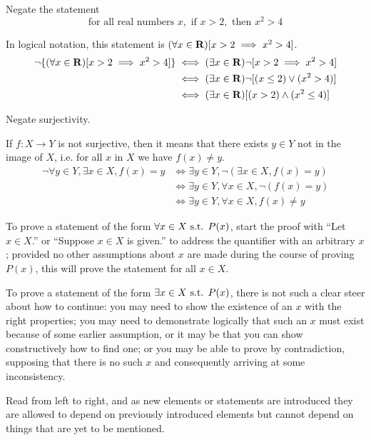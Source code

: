 \begin{exercise}
Negate the statement
\[ \text{for all real numbers } x, \text{ if } x>2, \text{ then } x^2>4 \]
\end{exercise}
\begin{solution}
In logical notation, this statement is $(\forall x \in \mathbf R)[x>2 \implies x^2>4]$.
\begin{align*}
\lnot\{(\forall x \in \mathbf R)[x>2 \implies x^2>4]\} 
&\iff (\exists x \in \mathbf R) \lnot[x>2 \implies x^2>4] \\
&\iff (\exists x \in \mathbf R) \lnot [(x\le2) \lor (x^2>4)] \\
&\iff (\exists x \in \mathbf R) [(x>2) \land (x^2\le4)]
\end{align*}
\end{solution}

\begin{exercise}
Negate surjectivity.
\end{exercise}
\begin{solution}
If $f:X\to Y$ is not surjective, then it means that there exists $y \in Y$ not in the image of $X$, i.e. for all $x$ in $X$ we have $f(x)\neq y$.
\begin{align*}
\lnot \forall y \in Y, \exists x \in X, f(x)=y 
&\iff \exists y \in Y, \lnot (\exists x \in X, f(x)=y) \\
&\iff \exists y \in Y, \forall x \in X, \lnot (f(x)=y) \\
&\iff \exists y \in Y, \forall x \in X, f(x) \neq y
\end{align*}
\end{solution}

To prove a statement of the form $\forall x \in X \text{ s.t. } P(x)$, start the proof with ``Let $x \in X$.'' or ``Suppose $x \in X$ is given.'' to address the quantifier with an arbitrary $x$; provided no other assumptions about $x$ are made during the course of proving $P(x)$, this will prove the statement for all $x \in X$. 

To prove a statement of the form $\exists x \in X \text{ s.t. } P(x)$, there is not such a clear steer about how to continue: you may need to show the existence of an $x$ with the right properties; you may need to demonstrate logically that such an $x$ must exist because of some earlier assumption, or it may be that you can show constructively how to find one; or you may be able to prove by contradiction, supposing that there is no such $x$ and consequently arriving at some inconsistency.

\begin{remark}
Read from left to right, and as new elements or statements are introduced they are allowed to depend on previously introduced elements but cannot depend on things that are yet to be mentioned.
\end{remark}

